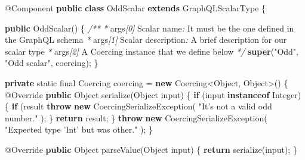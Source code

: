 \documentclass[]{book}
\newenvironment{Shaded}{\begin{snugshade}}{\end{snugshade}}
\newcommand{\KeywordTok}[1]{\textcolor[rgb]{0.13,0.29,0.53}{\textbf{#1}}}
\newcommand{\DataTypeTok}[1]{\textcolor[rgb]{0.13,0.29,0.53}{#1}}
\newcommand{\DecValTok}[1]{\textcolor[rgb]{0.00,0.00,0.81}{#1}}
\newcommand{\StringTok}[1]{\textcolor[rgb]{0.31,0.60,0.02}{#1}}
\newcommand{\CommentTok}[1]{\textcolor[rgb]{0.56,0.35,0.01}{\textit{#1}}}
\newcommand{\FunctionTok}[1]{\textcolor[rgb]{0.00,0.00,0.00}{#1}}
\newcommand{\BuiltInTok}[1]{#1}
\newcommand{\AttributeTok}[1]{\textcolor[rgb]{0.77,0.63,0.00}{#1}}
\newcommand{\NormalTok}[1]{#1}
\begin{document}
\begin{Shaded}
\begin{Highlighting}[]
\AttributeTok{@Component}
\KeywordTok{public} \KeywordTok{class}\NormalTok{ OddScalar }\KeywordTok{extends}\NormalTok{ GraphQLScalarType \{}


    \KeywordTok{public} \FunctionTok{OddScalar}\NormalTok{() \{}
        \CommentTok{/**}
        \CommentTok{*}\NormalTok{ args}\CommentTok{[0]}\NormalTok{ Scalar name}\CommentTok{:}\NormalTok{ It must be the one defined in the GraphQL schema}
        \CommentTok{*}\NormalTok{ args}\CommentTok{[1]}\NormalTok{ Scalar description}\CommentTok{:}\NormalTok{ A brief description for our scalar type}
        \CommentTok{*}\NormalTok{ args}\CommentTok{[2]}\NormalTok{ A Coercing instance that we define below}
        \CommentTok{*/}
        \KeywordTok{super}\NormalTok{(}\StringTok{"Odd"}\NormalTok{, }\StringTok{"Odd scalar"}\NormalTok{, coercing);}
\NormalTok{    \}}

    \KeywordTok{private} \DataTypeTok{static} \DataTypeTok{final}\NormalTok{ Coercing coercing = }\KeywordTok{new}\NormalTok{ Coercing<}\BuiltInTok{Object}\NormalTok{, }\BuiltInTok{Object}\NormalTok{>() \{}
        \AttributeTok{@Override}
        \KeywordTok{public} \BuiltInTok{Object} \FunctionTok{serialize}\NormalTok{(}\BuiltInTok{Object}\NormalTok{ input) \{}
             \KeywordTok{if}\NormalTok{ (input }\KeywordTok{instanceof} \BuiltInTok{Integer}\NormalTok{) \{}
                \KeywordTok{if}\NormalTok{ (result %
                    \KeywordTok{throw} \KeywordTok{new} \FunctionTok{CoercingSerializeException}\NormalTok{(}
                        \StringTok{"It's not a valid odd number."}
\NormalTok{                    );             }
\NormalTok{               \}}
               \KeywordTok{return}\NormalTok{ result;}
\NormalTok{            \}}
            \KeywordTok{throw} \KeywordTok{new} \FunctionTok{CoercingSerializeException}\NormalTok{(}
                     \StringTok{"Expected type 'Int' but was other."}
\NormalTok{            );}
\NormalTok{        \}}

        \AttributeTok{@Override}
        \KeywordTok{public} \BuiltInTok{Object} \FunctionTok{parseValue}\NormalTok{(}\BuiltInTok{Object}\NormalTok{ input) \{}
            \KeywordTok{return} \FunctionTok{serialize}\NormalTok{(input);}
\NormalTok{        \}}

}
\end{Highlighting}
\end{Shaded}
\end{document}

